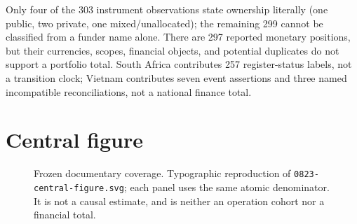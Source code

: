 \documentclass[11pt]{article}
\begin{document}
Only four of the 303 instrument observations state ownership literally (one
public, two private, one mixed/unallocated); the remaining 299 cannot be
classified from a funder name alone. There are 297 reported monetary positions,
but their currencies, scopes, financial objects, and potential duplicates do
not support a portfolio total. South Africa contributes 257 register-status
labels, not a transition clock; Vietnam contributes seven event assertions and
three named incompatible reconciliations, not a national finance total.

\section*{Central figure}
\begin{figure}[h]
\centering
{}
\caption{Frozen documentary coverage. Typographic reproduction of
\texttt{0823-central-figure.svg}; each panel uses the same atomic denominator.
It is not a causal estimate, and is neither an operation cohort nor a financial total.}
\label{fig:coverage}
\end{figure}
\end{document}
